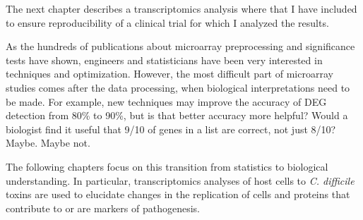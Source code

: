 The next chapter describes a transcriptomics
analysis where that I have included to ensure reproducibility
of a clinical trial for which I analyzed the results.

As the hundreds of publications about microarray preprocessing
and significance tests have shown, engineers
and statisticians have been very interested in techniques and optimization.
However, the most difficult part of microarray studies comes
after the data processing, when biological interpretations need 
to be made. For example, new techniques may improve the accuracy
of DEG detection from 80\% to 90\%, but is that better accuracy
more helpful? Would a biologist find it useful that 9/10 of 
genes in a list are correct, not just 8/10? Maybe. Maybe not.

The following chapters focus on this transition from statistics
to biological understanding. In particular, transcriptomics analyses
of host cells to \textit{C. difficile} toxins are used to elucidate
changes in the replication of cells and proteins that contribute to
or are markers of pathogenesis.






